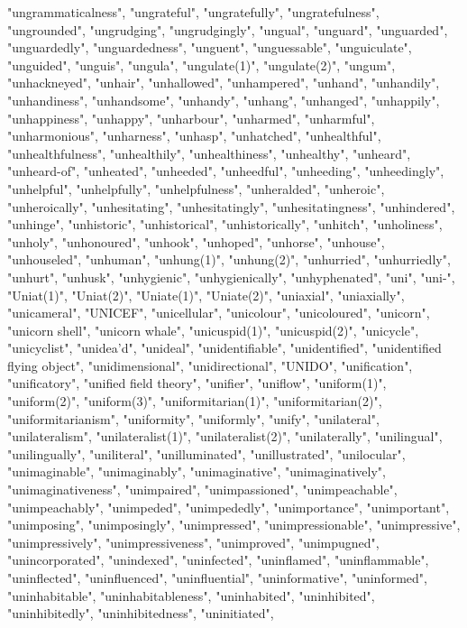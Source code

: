 "ungrammaticalness",
"ungrateful",
"ungratefully",
"ungratefulness",
"ungrounded",
"ungrudging",
"ungrudgingly",
"ungual",
"unguard",
"unguarded",
"unguardedly",
"unguardedness",
"unguent",
"unguessable",
"unguiculate",
"unguided",
"unguis",
"ungula",
"ungulate(1)",
"ungulate(2)",
"ungum",
"unhackneyed",
"unhair",
"unhallowed",
"unhampered",
"unhand",
"unhandily",
"unhandiness",
"unhandsome",
"unhandy",
"unhang",
"unhanged",
"unhappily",
"unhappiness",
"unhappy",
"unharbour",
"unharmed",
"unharmful",
"unharmonious",
"unharness",
"unhasp",
"unhatched",
"unhealthful",
"unhealthfulness",
"unhealthily",
"unhealthiness",
"unhealthy",
"unheard",
"unheard-of",
"unheated",
"unheeded",
"unheedful",
"unheeding",
"unheedingly",
"unhelpful",
"unhelpfully",
"unhelpfulness",
"unheralded",
"unheroic",
"unheroically",
"unhesitating",
"unhesitatingly",
"unhesitatingness",
"unhindered",
"unhinge",
"unhistoric",
"unhistorical",
"unhistorically",
"unhitch",
"unholiness",
"unholy",
"unhonoured",
"unhook",
"unhoped",
"unhorse",
"unhouse",
"unhouseled",
"unhuman",
"unhung(1)",
"unhung(2)",
"unhurried",
"unhurriedly",
"unhurt",
"unhusk",
"unhygienic",
"unhygienically",
"unhyphenated",
"uni",
"uni-",
"Uniat(1)",
"Uniat(2)",
"Uniate(1)",
"Uniate(2)",
"uniaxial",
"uniaxially",
"unicameral",
"UNICEF",
"unicellular",
"unicolour",
"unicoloured",
"unicorn",
"unicorn shell",
"unicorn whale",
"unicuspid(1)",
"unicuspid(2)",
"unicycle",
"unicyclist",
"unidea'd",
"unideal",
"unidentifiable",
"unidentified",
"unidentified flying object",
"unidimensional",
"unidirectional",
"UNIDO",
"unification",
"unificatory",
"unified field theory",
"unifier",
"uniflow",
"uniform(1)",
"uniform(2)",
"uniform(3)",
"uniformitarian(1)",
"uniformitarian(2)",
"uniformitarianism",
"uniformity",
"uniformly",
"unify",
"unilateral",
"unilateralism",
"unilateralist(1)",
"unilateralist(2)",
"unilaterally",
"unilingual",
"unilingually",
"uniliteral",
"unilluminated",
"unillustrated",
"unilocular",
"unimaginable",
"unimaginably",
"unimaginative",
"unimaginatively",
"unimaginativeness",
"unimpaired",
"unimpassioned",
"unimpeachable",
"unimpeachably",
"unimpeded",
"unimpededly",
"unimportance",
"unimportant",
"unimposing",
"unimposingly",
"unimpressed",
"unimpressionable",
"unimpressive",
"unimpressively",
"unimpressiveness",
"unimproved",
"unimpugned",
"unincorporated",
"unindexed",
"uninfected",
"uninflamed",
"uninflammable",
"uninflected",
"uninfluenced",
"uninfluential",
"uninformative",
"uninformed",
"uninhabitable",
"uninhabitableness",
"uninhabited",
"uninhibited",
"uninhibitedly",
"uninhibitedness",
"uninitiated",
